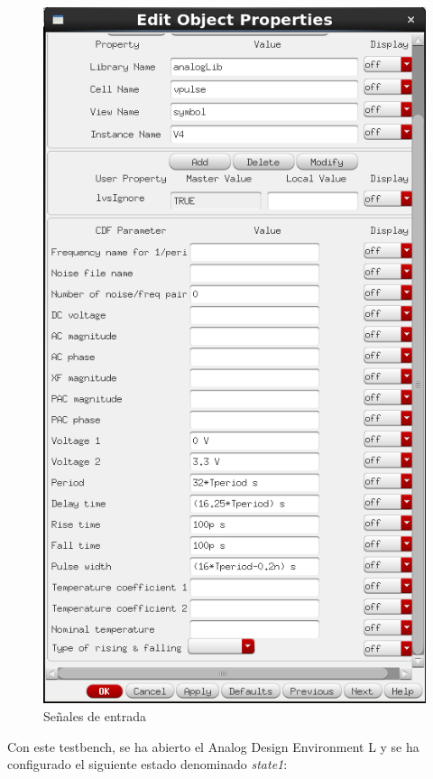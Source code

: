\begin{figure}[h]
\begin{multicols}{3}
    \includegraphics[width=1\linewidth]{figures/In4Config.PNG}\par 
    \end{multicols}
    \caption{Señales de entrada}
\end{figure} \newline
Con este testbench, se ha abierto el Analog Design Environment L y se ha configurado el siguiente estado denominado \textit{state1}:
